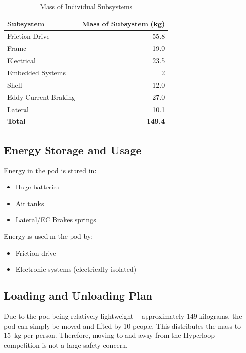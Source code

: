 \documentclass[main.tex]{subfiles}
\begin{document}
\begin{table}[H]
\centering
\begin{tabular}{@{}lr@{}}
	\toprule Subsystem & Mass of Subsystem (\si{kg}) \\ \midrule
    Friction Drive & 55.8 \\
    Frame & 19.0 \\
    Electrical & 23.5 \\
    Embedded Systems & 2 \\
    Shell & 12.0 \\
    Eddy Current Braking & 27.0 \\
    Lateral & 10.1 \\ \midrule
    \textbf{Total} & \textbf{149.4}
\end{tabular}
  \caption{Mass of Individual Subsystems}
  \label{table:mass}
\end{table}


\subsection{Energy Storage and Usage}
Energy in the pod is stored in:
\begin{itemize}
    \item Huge batteries
    \item Air tanks
    \item Lateral/EC Brakes springs
\end{itemize}
Energy is used in the pod by:
\begin{itemize}
    \item Friction drive
    \item Electronic systems (electrically isolated)
\end{itemize}


\subsection{Loading and Unloading Plan}
Due to the pod being relatively lightweight – approximately 149 kilograms, the pod can simply be moved and lifted by 10 people. This distributes the mass to \SI{15}{kg} per person. Therefore, moving to and away from the Hyperloop competition is not a large safety concern.
\end{document}
